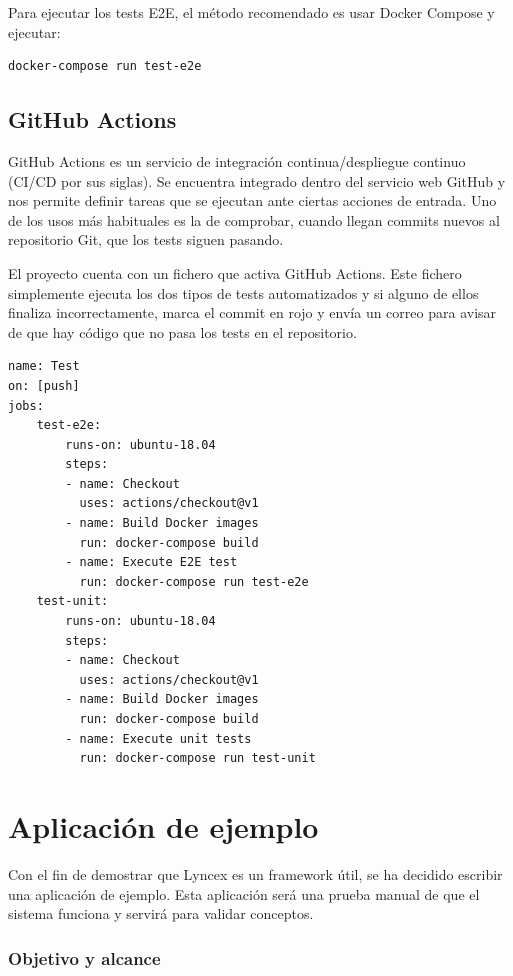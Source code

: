 \documentclass[12pt]{report} %
\begin{document}
Para ejecutar los tests E2E, el método recomendado es usar Docker Compose y ejecutar:

\begin{verbatim}
docker-compose run test-e2e
\end{verbatim}

\section{GitHub Actions}

GitHub Actions es un servicio de integración continua/despliegue continuo (CI/CD por sus siglas). Se encuentra integrado dentro del servicio web GitHub y nos permite definir tareas que se ejecutan ante ciertas acciones de entrada. Uno de los usos más habituales es la de comprobar, cuando llegan commits nuevos al repositorio Git, que los tests siguen pasando.

El proyecto cuenta con un fichero que activa GitHub Actions. Este fichero simplemente ejecuta los dos tipos de tests automatizados y si alguno de ellos finaliza incorrectamente, marca el commit en rojo y envía un correo para avisar de que hay código que no pasa los tests en el repositorio.

\begin{lstlisting}
name: Test
on: [push]
jobs:
    test-e2e:
        runs-on: ubuntu-18.04
        steps:
        - name: Checkout
          uses: actions/checkout@v1
        - name: Build Docker images
          run: docker-compose build
        - name: Execute E2E test
          run: docker-compose run test-e2e
    test-unit:
        runs-on: ubuntu-18.04
        steps:
        - name: Checkout
          uses: actions/checkout@v1
        - name: Build Docker images
          run: docker-compose build
        - name: Execute unit tests
          run: docker-compose run test-unit
\end{lstlisting}

\chapter{Aplicación de ejemplo}

Con el fin de demostrar que Lyncex es un framework útil, se ha decidido escribir una aplicación de ejemplo. Esta aplicación será una prueba manual de que el sistema funciona y servirá para validar conceptos.

\subsection{Objetivo y alcance}
\end{document}
